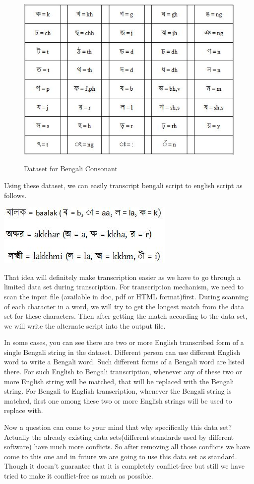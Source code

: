 \documentclass[12pt,oneside,openany,a4paper]{book}
\begin{document}
\begin{figure}
		\caption{Dataset for Bengali Consonant}
		\centering
		\includegraphics[scale=0.7]{consonent}
		\label{fig:consonent}
\end{figure} \par
Using these dataset, we can easily transcript bengali script to english script as follows.
\begin{center}
\includegraphics[scale=0.6]{btoe}
\end{center}

That idea will definitely make transcription easier as we have to go through a limited data set during transcription. For transcription mechanism, we need to scan the input file (available in doc, pdf or HTML format)first. During scanning of each character in a word, we will try to get the longest match from the data set for these characters. Then after getting the match according to the data set, we will write the alternate script into the output file. 
\par
In some cases, you can see there are two or more English transcribed form of a single Bengali string in the dataset. Different person can use different English word to write a Bengali word. Such different forms of a Bengali word are listed there. For such English to Bengali transcription, whenever any of these two or more English string will be matched, that will be replaced with the Bengali string. For Bengali to English transcription, whenever the Bengali string is matched, first one among these two or more English strings will be used to replace with.
\par
Now a question can come to your mind that why specifically this data set? Actually the already existing data sets(different standards used by different software) have much more conflicts. So after removing all those conflicts we have come to this one and in future we are going to use this data set as standard. Though it doesn't guarantee that it is completely conflict-free but still we have tried to make it conflict-free as much as possible.  
\end{document}
